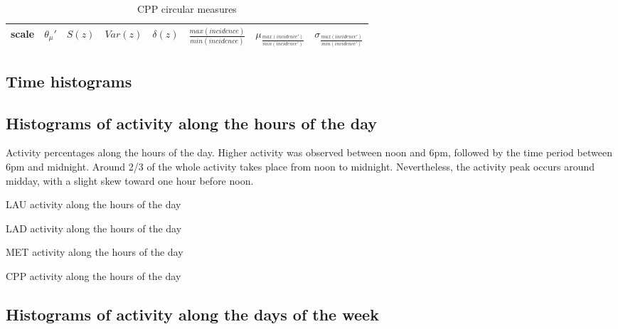 \documentclass[%
 aip,
 jmp,%
 amsmath,amssymb,
 reprint,%
 floatfix,
]{revtex4-1}
\begin{document}
\begin{table}[!h]
	\caption{CPP circular measures}
\begin{center}
    \begin{tabular}{ |l|| c|c|c|c|c||c|c| }
        \hline
scale & $\theta_\mu'$ & $S(z)$ & $Var(z)$ & $\delta(z)$ & $\frac{max(incidence)}{min(incidence)}$ & $ \mu_{\frac{max(incidence')}{min(incidence')}} $ & $ \sigma_{\frac{max(incidence')}{min(incidence')} } $ \\ \hline\hline
	
    \end{tabular}
\end{center}
\label{tab:circ}
\end{table}

\FloatBarrier
\subsection{Time histograms}
\subsection{Histograms of activity along the hours of the day}

Activity percentages along the hours of the day. Higher activity was observed between noon and 6pm, followed by the time period between 6pm and midnight. Around 2/3 of the whole activity takes place from noon to midnight. Nevertheless, the activity peak occurs around midday, with a slight skew toward one hour before noon.
\begin{table}[!h]
	\caption{LAU activity along the hours of the day}
	\footnotesize
	
\end{table}

\begin{table}[!h]
	\caption{LAD activity along the hours of the day}
	\footnotesize
	
\end{table}

\begin{table}[!h]
	\caption{MET activity along the hours of the day}
	\footnotesize
	
\end{table}

\begin{table}[!h]
	\caption{CPP activity along the hours of the day}
	\footnotesize
	
\end{table}

\FloatBarrier
\subsection{Histograms of activity along the days of the week}
\end{document}
